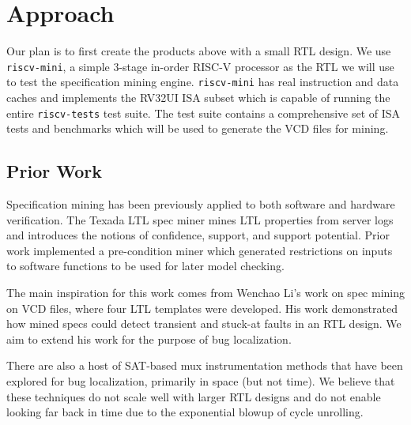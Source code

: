 \documentclass[acmlarge,11pt,nonacm]{acmart}
\begin{document}
\section{Approach}
Our plan is to first create the products above with a small RTL design.
We use \texttt{riscv-mini}\cite{riscv-mini}, a simple 3-stage in-order RISC-V processor as the RTL we will use to test the specification mining engine.
\texttt{riscv-mini} has real instruction and data caches and implements the RV32UI ISA subset which is capable of running the entire \texttt{riscv-tests}\cite{riscv-tests} test suite.
The test suite contains a comprehensive set of ISA tests and benchmarks which will be used to generate the VCD files for mining.

\subsection{Prior Work}
Specification mining has been previously applied to both software and hardware verification.
The Texada LTL spec miner\cite{Lemieux_2015} mines LTL properties from server logs and introduces the notions of confidence, support, and support potential.
Prior work\cite{Yamaguchi_2016} implemented a pre-condition miner which generated restrictions on inputs to software functions to be used for later model checking.

The main inspiration for this work comes from Wenchao Li's\cite{Li_2010}\cite{Li_2014} work on spec mining on VCD files, where four LTL templates were developed.
His work demonstrated how mined specs could detect transient and stuck-at faults in an RTL design.
We aim to extend his work for the purpose of bug localization.

There are also a host of SAT-based mux instrumentation methods\cite{Mirzaeian_2008}\cite{Smith_2005}\cite{Chang_2007} that have been explored for bug localization, primarily in space (but not time).
We believe that these techniques do not scale well with larger RTL designs and do not enable looking far back in time due to the exponential blowup of cycle unrolling.
\end{document}
